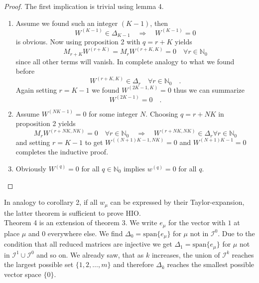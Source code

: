 \begin{proof}
	The first implication is trivial using lemma 4. \\
	\begin{enumerate}
	\item 
		Assume we found such an integer $(K-1)$, then 
		\begin{equation}
		W^{(K-1)} \in \Delta_{K-1} \quad \Rightarrow \quad W^{(K-1)}=0
		\end{equation}
		is obvious. Now using proposition 2 with $q=r+K$ yields
		\begin{equation}
		M_{r+K} W^{(r+K)} = M_{r} W^{(r+K,K)} = 0\quad \forall r\in\mathbb{N}_0
		\end{equation}
		since all other terms will vanish. In complete analogy to what we found before
		\begin{equation}
		W^{(r+K,K)} \in \Delta_r \quad \forall r\in\mathbb{N}_0 \quad .
		\end{equation}
		Again setting $r=K-1$ we found $W^{(2K-1,K)}=0$ thus we can summarize
		\begin{equation}
		W^{(2K-1)} = 0 \quad .
		\end{equation}
	\item Assume $W^{(NK-1)}=0$ for some integer $N$. Choosing $q=r+NK$ in
		proposition 2 yields
		\begin{equation}
		M_r W^{(r+NK,NK)} = 0 \quad \forall r \in \mathbb{N}_0 \quad \Rightarrow \quad 
		 W^{(r+NK,NK)} \in \Delta_r \forall r\in \mathbb{N}_0
		\end{equation}
		and setting $r=K-1$ to get $W^{((N+1)K -1,NK)}=0$ and $W^{(N+1)K-1}=0$ completes 
		the inductive proof.
	\item Obviously $W^{(q)}=0$ for all $q\in\mathbb{N}_0$ implies $w^{(q)}=0$ for all $q$.
	\end{enumerate}
\end{proof}


\begin{corollary}{}{}
	In analogy to corollary 2, if all $w_\mu$ can be expressed by their Taylor-expansion, 
	the latter theorem is sufficient to prove HIO. \\
	
	Theorem 4 is an extension of theorem 3. We write $e_\mu$ for the vector with $1$ at 
	place $\mu$ and $0$ everywhere else. We find $\Delta_0=\text{span}\{e_\mu\}$ for $\mu$ 
	not in $\mathcal{I}^0$. Due to the condition that all reduced matrices are injective 
	we get $\Delta_1 =\text{span} \{e_\mu\}$ for $\mu$ not in $\mathcal{I}^1\cup 
	\mathcal{I}^0$ and so on. We already saw, that as $k$ increases, the union of 
	$\mathcal{I}^k$ reaches the 
	largest possible set $\{1,2,\ldots,m\}$ and therefore $\Delta_k$ reaches the smallest 
	possible vector space $\{0\}$.
\end{corollary}


